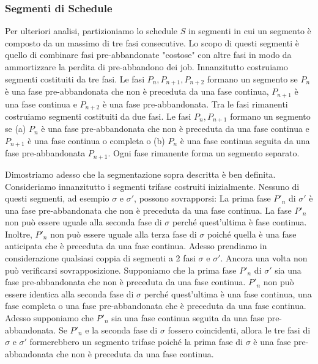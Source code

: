 \documentclass[12pt]{article}
\begin{document}
\subsubsection{Segmenti di Schedule}
Per ulteriori analisi, partizioniamo lo schedule $S$ in segmenti in cui un segmento è composto da un massimo di tre fasi consecutive. Lo scopo di questi segmenti è quello di combinare fasi pre-abbandonate "costose" con altre fasi in modo da ammortizzare la perdita di pre-abbandono dei job. Innanzitutto costruiamo segmenti costituiti da tre fasi. Le fasi $P_{n}, P_{n + 1}, P_{n + 2}$ formano un segmento se $P_{n}$ è una fase pre-abbandonata che non è preceduta da una fase continua, $P_{n + 1}$ è una fase continua e $P_{n + 2}$ è una fase pre-abbandonata. Tra le fasi rimanenti costruiamo segmenti costituiti da due fasi. Le fasi $P_{n}, P_{n + 1}$ formano un segmento se (a) $P_{n}$ è una fase pre-abbandonata che non è preceduta da una fase continua e $P_{n + 1}$ è una fase continua o completa o (b) $P_{n}$ è una fase continua seguita da una fase pre-abbandonata $P_{n + 1}$. Ogni fase rimanente forma un segmento separato. 

Dimostriamo adesso che la segmentazione sopra descritta è ben definita. Consideriamo innanzitutto i segmenti trifase costruiti inizialmente. Nessuno di questi segmenti, ad esempio $\sigma$ e $\sigma'$, possono sovrapporsi: La prima fase $P'_{n}$ di $\sigma'$ è una fase pre-abbandonata che non è preceduta da una fase continua. La fase $P'_{n}$ non può essere uguale alla seconda fase di $\sigma$ perché quest'ultima è fase continua. Inoltre, $P'_{n}$ non può essere uguale alla terza fase di $\sigma$ poiché quella è una fase anticipata che è preceduta da una fase continua. Adesso prendiamo in considerazione qualsiasi coppia di segmenti a 2 fasi $\sigma$ e $\sigma'$. Ancora una volta non può verificarsi sovrapposizione. Supponiamo che la prima fase $P'_{n}$ di $\sigma'$ sia una fase pre-abbandonata che non è preceduta da una fase continua. $P'_{n}$ non può essere identica alla seconda fase di $\sigma$ perché quest'ultima è una fase continua, una fase completa o una fase pre-abbandonata che è preceduta da una fase continua. Adesso supponiamo che $P'_{n}$ sia una fase continua seguita da una fase pre-abbandonata. Se $P'_{n}$ e la seconda fase di $\sigma$ fossero coincidenti, allora le tre fasi di $\sigma$ e $\sigma'$ formerebbero un segmento trifase poiché la prima fase di $\sigma$ è una fase pre-abbandonata che non è preceduta da una fase continua.
\end{document}
